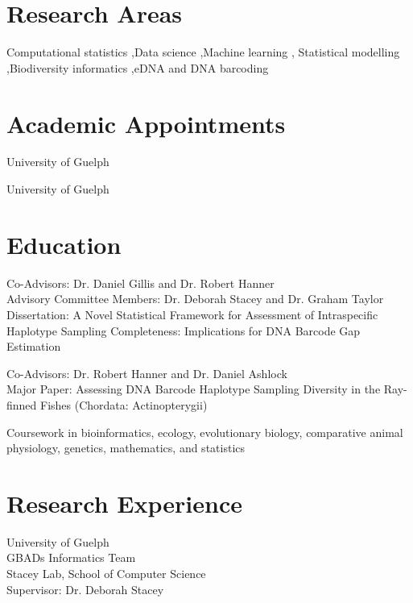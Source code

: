 \section{Research Areas}
Computational statistics \sep Data science \sep Machine learning \sep
Statistical modelling \sep Biodiversity informatics \sep eDNA and DNA barcoding

\section{Academic Appointments}
University of Guelph

\smallskip
{}
University of Guelph

\section{Education}
Co-Advisors: Dr. Daniel Gillis and Dr. Robert Hanner\\
Advisory Committee Members: Dr. Deborah Stacey and Dr. Graham Taylor\\
Dissertation: A Novel Statistical Framework for Assessment of Intraspecific
Haplotype Sampling Completeness: Implications for DNA Barcode Gap Estimation

\medskip
{}
Co-Advisors: Dr. Robert Hanner and Dr. Daniel Ashlock\\
Major Paper: Assessing DNA Barcode Haplotype Sampling Diversity in the
Ray-finned Fishes (Chordata: Actinopterygii)

\medskip
{}
Coursework in bioinformatics, ecology, evolutionary biology, comparative animal
physiology, genetics, mathematics, and statistics

\section{Research Experience}
University of Guelph\\
GBADs Informatics Team\\
Stacey Lab, School of Computer Science\\
Supervisor: Dr. Deborah Stacey

